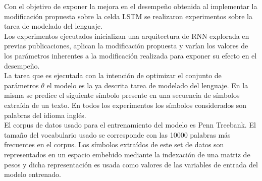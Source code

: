 \documentclass{article}
\begin{document}
	Con el objetivo de exponer la mejora en el desempeño obtenida al implementar la modificación propuesta sobre la celda LSTM se realizaron experimentos sobre la tarea de modelado del lenguaje.\\ Los experimentos ejecutados inicializan una arquitectura de RNN explorada en previas publicaciones\cite{14RegularizationZaremba}, aplican la modificación propuesta y varían los valores de los parámetros inherentes a la modificación realizada para exponer su efecto en el desempeño.\\
	La tarea que es ejecutada con la intención de optimizar el conjunto de parámetros $\theta$ el modelo es la ya descrita tarea de modelado del lenguaje. En la misma se predice el siguiente símbolo presente en una secuencia de símbolos extraída de un texto. En todos los experimentos los símbolos considerados son palabras del idioma inglés.\\
	El corpus de datos usado para el entrenamiento del modelo es Penn Treebank\cite{41PennTreebankMarcus}. El tamaño del vocabulario usado se corresponde con las 10000 palabras más frecuentes en el corpus. Los símbolos extraídos de este set de datos son representados en un espacio embebido mediante la indexación de una matriz de pesos y dicha representación es usada como valores de las variables de entrada del modelo entrenado. \\
	
\end{document}
